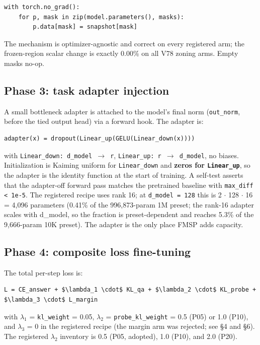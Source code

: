 \documentclass[11pt]{article}
\begin{document}
\begin{lstlisting}
with torch.no_grad():
    for p, mask in zip(model.parameters(), masks):
        p.data[mask] = snapshot[mask]
\end{lstlisting}

The mechanism is optimizer-agnostic and correct on every registered arm; the frozen-region scalar change is exactly 0.00\% on all V78 zoning arms. Empty masks no-op.

\subsection{Phase 3: task adapter injection}

A small bottleneck adapter is attached to the model's final norm (\texttt{out\_norm}, before the tied output head) via a forward hook. The adapter is:

\begin{lstlisting}
adapter(x) = dropout(Linear_up(GELU(Linear_down(x))))
\end{lstlisting}

with \texttt{Linear\_down: d\_model $\to$ r}, \texttt{Linear\_up: r $\to$ d\_model}, no biases. Initialization is Kaiming uniform for \texttt{Linear\_down} and \textbf{zeros for \texttt{Linear\_up}}, so the adapter is the identity function at the start of training. A self-test asserts that the adapter-off forward pass matches the pretrained baseline with \texttt{max\_diff < 1e-5}. The registered recipe uses rank 16; at \texttt{d\_model = 128} this is 2 $\cdot$ 128 $\cdot$ 16 = 4{,}096 parameters (0.41\% of the 996{,}873-param 1M preset; the rank-16 adapter scales with d\_model, so the fraction is preset-dependent and reaches 5.3\% of the 9{,}666-param 10K preset). The adapter is the only place FMSP adds capacity.

\subsection{Phase 4: composite loss fine-tuning}

The total per-step loss is:

\begin{lstlisting}
L = CE_answer + $\lambda_1 \cdot$ KL_qa + $\lambda_2 \cdot$ KL_probe + $\lambda_3 \cdot$ L_margin
\end{lstlisting}

with $\lambda_1$ = \texttt{kl\_weight} = 0.05, $\lambda_2$ = \texttt{probe\_kl\_weight} = 0.5 (P05) or 1.0 (P10), and $\lambda_3$ = 0 in the registered recipe (the margin arm was rejected; see \S4 and \S6). The registered $\lambda_2$ inventory is 0.5 (P05, adopted), 1.0 (P10), and 2.0 (P20).
\end{document}
